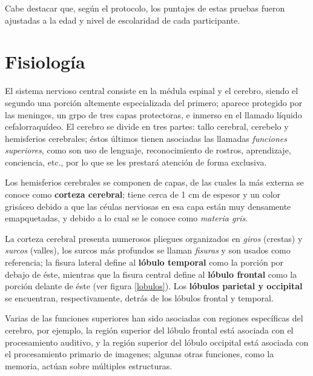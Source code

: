 Cabe destacar que, según el protocolo, los puntajes de estas pruebas fueron ajustadas a la edad y 
nivel de escolaridad de cada participante.


\section{Fisiología}

El sistema nervioso central consiste en la médula espinal y el cerebro, siendo el segundo una
porción altemente especializada del primero; aparece protegido por las meninges, un grpo de tres 
capas protectoras, e inmerso en el llamado líquido cefalorraquídeo.
El cerebro se divide en tres partes: tallo cerebral, cerebelo y hemisferios cerebrales; éstos 
últimos tienen asociadas las llamadas \textit{funciones superiores}, como son uso de lenguaje,
reconocimiento de rostros, aprendizaje, conciencia, etc., por lo que se les prestará atención de 
forma exclusiva.

Los hemisferios cerebrales se componen de capas, de las cuales la más externa se conoce como
\textbf{corteza cerebral}; tiene cerca de 1 cm de espesor y un color grisáceo debido a que las 
céulas nerviosas en esa capa están muy densamente emapquetadas, y debido a lo cual se le conoce
como \textit{materia gris}.

La corteza cerebral presenta numerosos pliegues organizados en \textit{giros} (crestas) y
\textit{surcos} (valles), los surcos más profundos se llaman \textit{fisuras} y son usados como 
referencia; la fisura lateral define al \textbf{lóbulo temporal} como la porción por debajo de 
éste, mientras que la fisura central define al \textbf{lóbulo frontal} como la porción delante de 
éste (ver figura \ref{lobulos}). Los \textbf{lóbulos parietal y occipital} se encuentran, 
respectivamente, detrás de los lóbulos frontal y temporal.

Varias de las funciones superiores han sido asociadas con regiones específicas del cerebro, por
ejemplo, la región superior del lóbulo frontal está asociada con el procesamiento auditivo, y la
región superior del lóbulo occipital está asociada con el procesamiento primario de imagenes;
algunas otras funciones, como la memoria, actúan sobre múltiples estructuras.

